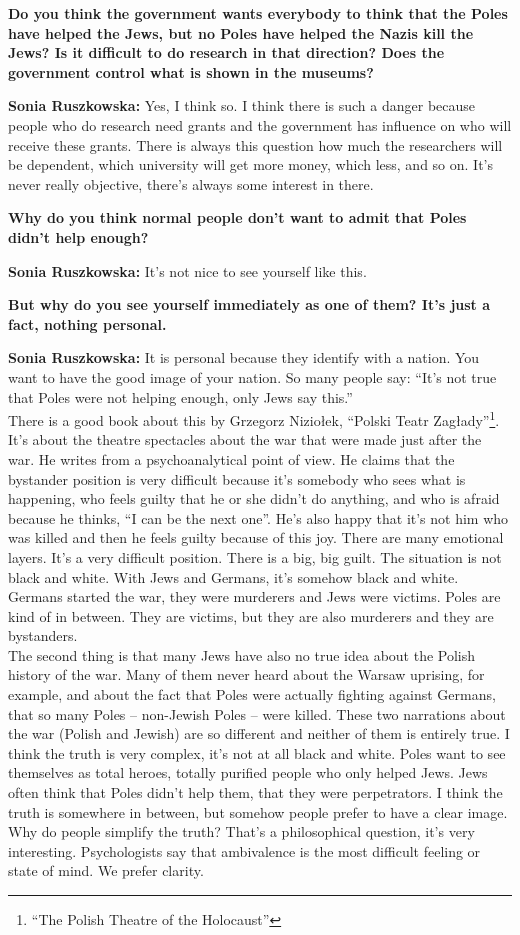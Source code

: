 \textbf{Do you think the government wants everybody to think that the Poles have helped the Jews, but no Poles have helped the Nazis kill the Jews? Is it difficult to do research in that direction? Does the government control what is shown in the museums?} 

\textbf{Sonia Ruszkowska:} Yes, I think so. I think there is such a danger because people who do research need grants and the government has influence on who will receive these grants. There is always this question how much the researchers will be dependent, which university will get more money, which less, and so on. It’s never really objective, there’s always some interest in there. 

\textbf{Why do you think normal people don’t want to admit that Poles didn’t help enough?} 

\textbf{Sonia Ruszkowska:} It’s not nice to see yourself like this. 

\textbf{But why do you see yourself immediately as one of them? It’s just a fact, nothing personal.} 

\textbf{Sonia Ruszkowska:} It is personal because they identify with a nation. You want to have the good image of your nation. So many people say: ``It's not true that Poles were not helping enough, only Jews say this.''\\
There is a good book about this by Grzegorz Niziołek, ``Polski Teatr Zagłady''\footnote{``The Polish Theatre of the Holocaust''}. It’s about the theatre spectacles about the war that were made just after the war. He writes from a psychoanalytical point of view. He claims that the bystander position is very difficult because it’s somebody who sees what is happening, who feels guilty that he or she didn’t do anything, and who is afraid because he thinks, ``I can be the next one''. He's also happy that it’s not him who was killed and then he feels guilty because of this joy. There are many emotional layers. It’s a very difficult position. There is a big, big guilt. The situation is not black and white. With Jews and Germans, it’s somehow black and white. Germans started the war, they were murderers and Jews were victims. Poles are kind of in between. They are victims, but they are also murderers and they are bystanders.\\ 
The second thing is that many Jews have also no true idea about the Polish history of the war. Many of them never heard about the Warsaw uprising, for example, and about the fact that Poles were actually fighting against Germans, that so many Poles – non-Jewish Poles – were killed. These two narrations about the war (Polish and Jewish) are so different and neither of them is entirely true. I think the truth is very complex, it’s not at all black and white. Poles want to see themselves as total heroes, totally purified people who only helped Jews. Jews often think that Poles didn’t help them, that they were perpetrators. I think the truth is somewhere in between, but somehow people prefer to have a clear image. Why do people simplify the truth? That’s a philosophical question, it’s very interesting. Psychologists say that ambivalence is the most difficult feeling or state of mind. We prefer clarity. 

